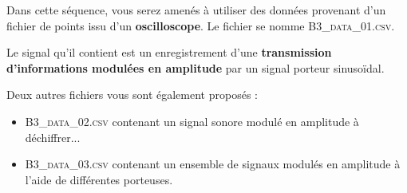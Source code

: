 

Dans cette séquence, vous serez amenés à utiliser des données provenant d'un fichier de points issu d'un \textbf{oscilloscope}. Le fichier se nomme \mbox{\textsc{B3\_data\_01.csv}}.

Le signal qu'il contient est un enregistrement d'une \textbf{transmission d'informations modulées en amplitude} par un signal porteur sinusoïdal.

\medskip

Deux autres fichiers vous sont également proposés :
\begin{itemize}
	\item  \mbox{\textsc{B3\_data\_02.csv}} contenant un signal sonore modulé en amplitude à déchiffrer...
	\item  \mbox{\textsc{B3\_data\_03.csv}} contenant un ensemble de signaux modulés en amplitude à l'aide de différentes porteuses.
\end{itemize}


